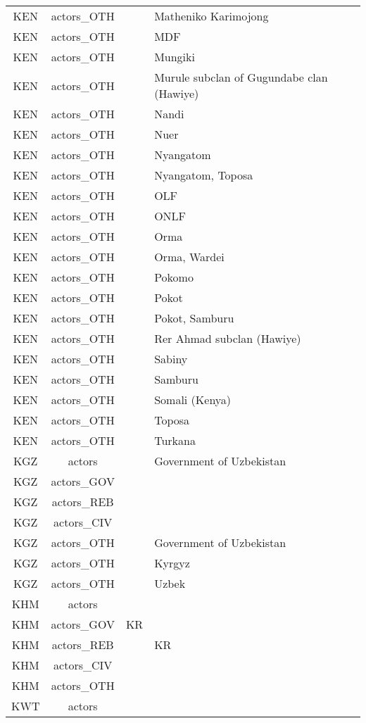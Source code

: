 \documentclass[12pt]{article}
\begin{document}
\begin{center}
\begin{longtable}{|c|c|p{7cm}|p{7cm}|}
  KEN & actors\_OTH &  & Matheniko Karimojong \\ 
  KEN & actors\_OTH &  & MDF \\ 
  KEN & actors\_OTH &  & Mungiki \\ 
  KEN & actors\_OTH &  & Murule subclan of Gugundabe clan (Hawiye) \\ 
  KEN & actors\_OTH &  & Nandi \\ 
  KEN & actors\_OTH &  & Nuer \\ 
  KEN & actors\_OTH &  & Nyangatom \\ 
  KEN & actors\_OTH &  & Nyangatom, Toposa \\ 
  KEN & actors\_OTH &  & OLF \\ 
  KEN & actors\_OTH &  & ONLF \\ 
  KEN & actors\_OTH &  & Orma \\ 
  KEN & actors\_OTH &  & Orma, Wardei \\ 
  KEN & actors\_OTH &  & Pokomo \\ 
  KEN & actors\_OTH &  & Pokot \\ 
  KEN & actors\_OTH &  & Pokot, Samburu \\ 
  KEN & actors\_OTH &  & Rer Ahmad subclan (Hawiye) \\ 
  KEN & actors\_OTH &  & Sabiny \\ 
  KEN & actors\_OTH &  & Samburu \\ 
  KEN & actors\_OTH &  & Somali (Kenya) \\ 
  KEN & actors\_OTH &  & Toposa \\ 
  KEN & actors\_OTH &  & Turkana \\ 
  KGZ & actors &  & Government of Uzbekistan \\ 
  KGZ & actors\_GOV &  &  \\ 
  KGZ & actors\_REB &  &  \\ 
  KGZ & actors\_CIV &  &  \\ 
  KGZ & actors\_OTH &  & Government of Uzbekistan \\ 
  KGZ & actors\_OTH &  & Kyrgyz \\ 
  KGZ & actors\_OTH &  & Uzbek \\ 
  KHM & actors &  &  \\ 
  KHM & actors\_GOV & KR &  \\ 
  KHM & actors\_REB &  & KR \\ 
  KHM & actors\_CIV &  &  \\ 
  KHM & actors\_OTH &  &  \\ 
  KWT & actors &  &  \\ 

\end{longtable}
\end{center}
\end{document}
